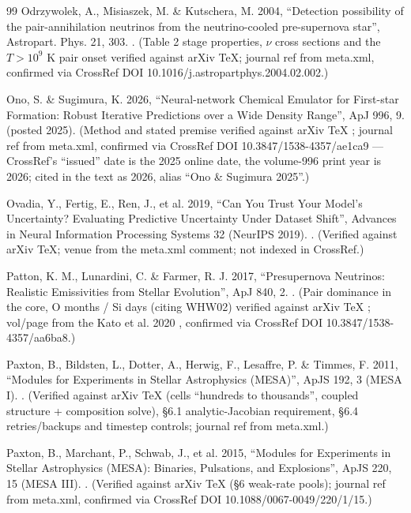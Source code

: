 \begin{thebibliography}{99}
Odrzywolek, A., Misiaszek, M. \& Kutschera, M. 2004, ``Detection possibility of the pair-annihilation neutrinos from the neutrino-cooled pre-supernova star'', Astropart. Phys. 21, 303. . (Table 2 stage properties, $\nu$ cross sections and the $T > 10^9$ K pair onset verified against arXiv TeX; journal ref from meta.xml, confirmed via CrossRef DOI 10.1016/j.astropartphys.2004.02.002.)

Ono, S. \& Sugimura, K. 2026, ``Neural-network Chemical Emulator for First-star Formation: Robust Iterative Predictions over a Wide Density Range'', ApJ 996, 9.  (posted 2025). (Method and stated premise verified against arXiv TeX ; journal ref from meta.xml, confirmed via CrossRef DOI 10.3847/1538-4357/ae1ca9 --- CrossRef's ``issued'' date is the 2025 online date, the volume-996 print year is 2026; cited in the text as 2026, alias ``Ono \& Sugimura 2025''.)

Ovadia, Y., Fertig, E., Ren, J., et al. 2019, ``Can You Trust Your Model's Uncertainty? Evaluating Predictive Uncertainty Under Dataset Shift'', Advances in Neural Information Processing Systems 32 (NeurIPS 2019). . (Verified against arXiv TeX; venue from the meta.xml comment; not indexed in CrossRef.)

Patton, K. M., Lunardini, C. \& Farmer, R. J. 2017, ``Presupernova Neutrinos: Realistic Emissivities from Stellar Evolution'', ApJ 840, 2. . (Pair dominance in the core, O months / Si days (citing WHW02) verified against arXiv TeX ; vol/page from the Kato et al. 2020 , confirmed via CrossRef DOI 10.3847/1538-4357/aa6ba8.)

Paxton, B., Bildsten, L., Dotter, A., Herwig, F., Lesaffre, P. \& Timmes, F. 2011, ``Modules for Experiments in Stellar Astrophysics (MESA)'', ApJS 192, 3 (MESA I). . (Verified against arXiv TeX  (cells ``hundreds to thousands'', coupled structure + composition solve), \S 6.1 analytic-Jacobian requirement, \S 6.4 retries/backups and timestep controls; journal ref from meta.xml.)

Paxton, B., Marchant, P., Schwab, J., et al. 2015, ``Modules for Experiments in Stellar Astrophysics (MESA): Binaries, Pulsations, and Explosions'', ApJS 220, 15 (MESA III). . (Verified against arXiv TeX (\S 6 weak-rate pools); journal ref from meta.xml, confirmed via CrossRef DOI 10.1088/0067-0049/220/1/15.)


\end{thebibliography}
